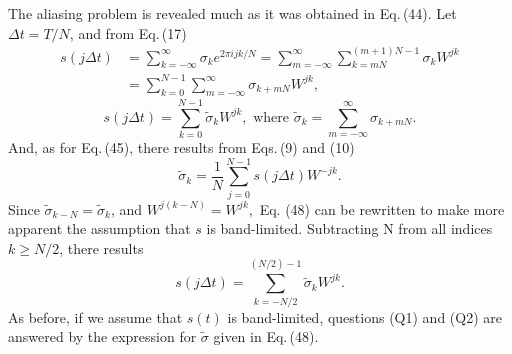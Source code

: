 \documentclass[twoside]{MATH77}
\begin{document}
The aliasing problem is revealed much as it was obtained in Eq.\,(44). Let
$\Delta t=T/N$, and from Eq.\,(17)%
\begin{equation*}
\begin{split}
s(j\Delta t)&=\!\sum_{k=-\infty }^\infty \!\sigma _ke^{2\pi
ijk/N}=\!\sum_{m=-\infty }^\infty \!\!\sum_{k=mN}^{(m+1)N-1}\!\!\sigma
_kW^{jk}\\
&=\sum_{k=0}^{N-1}\sum_{m=-\infty }^\infty \sigma _{k+mN}W^{jk},
\end{split}
\end{equation*}
\begin{equation}\label{O48}
s(j\Delta t)=\sum_{k=0}^{N-1}\tilde \sigma _kW^{jk},\text{ where }%
\tilde \sigma _k=\sum_{m=-\infty }^\infty \sigma _{k+mN}.
\end{equation}
And, as for Eq.\,(45), there results from Eqs.\,(9) and (10)
\begin{equation}\label{O49}
\tilde \sigma _k=\frac 1N\sum_{j=0}^{N-1}s(j\Delta t)W^{-jk}.
\end{equation}
Since $\tilde \sigma _{k-N}=\tilde \sigma _k$, and $W^{j(k-N)}=W^{jk},$ Eq.
(48) can be rewritten to make more apparent the assumption that $s$ is
band-limited. Subtracting N from all indices $k\geq N/2$, there results
\begin{equation}\label{O50}
s(j\Delta t)=\sum_{k=-N/2}^{(N/2)-1}\tilde \sigma _kW^{jk}.
\end{equation}
As before, if we assume that $s(t)$ is band-limited, questions (Q1) and (Q2)
are answered by the expression for $\tilde \sigma $ given in Eq.\,(48).
\end{document}
